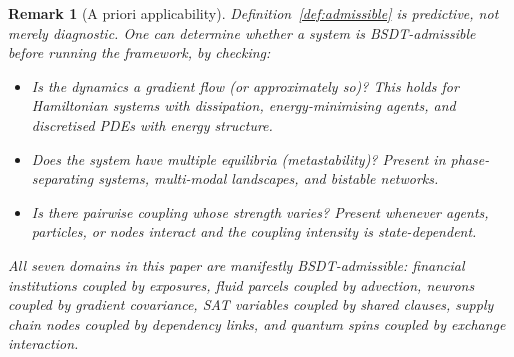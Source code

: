 \documentclass[11pt,a4paper]{article}
\newtheorem{remark}[theorem]{Remark}
\begin{document}
\begin{remark}[A priori applicability]
\label{rem:apriori}
Definition~\ref{def:admissible} is \emph{predictive}, not merely
diagnostic.  One can determine whether a system is BSDT-admissible
\emph{before} running the framework, by checking:
\begin{itemize}[nosep]
  \item Is the dynamics a gradient flow (or approximately so)?  This
    holds for Hamiltonian systems with dissipation, energy-minimising
    agents, and discretised PDEs with energy structure.
  \item Does the system have multiple equilibria (metastability)?
    Present in phase-separating systems, multi-modal landscapes,
    and bistable networks.
  \item Is there pairwise coupling whose strength varies?
    Present whenever agents, particles, or nodes interact and the
    coupling intensity is state-dependent.
\end{itemize}
All seven domains in this paper are manifestly BSDT-admissible:
financial institutions coupled by exposures, fluid parcels coupled
by advection, neurons coupled by gradient covariance, SAT variables
coupled by shared clauses, supply chain nodes coupled by dependency
links, and quantum spins coupled by exchange interaction.
\end{remark}
\end{document}
